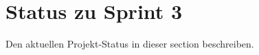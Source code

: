 \section{Status zu Sprint 3
}\label{sec:status}

Den aktuellen Projekt-Status in  dieser section beschreiben.

